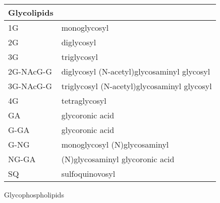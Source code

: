 \singlespace


\begin{tabular}{ l l }
Glycolipids & \\
\toprule
1G & monoglycosyl\\
2G & diglycosyl\\
3G & triglycosyl\\
2G-NAcG-G & diglycosyl (N-acetyl)glycosaminyl glycosyl\\
3G-NAcG-G & triglycosyl (N-acetyl)glycosaminyl glycosyl\\
4G & tetraglycosyl\\
GA & glycoronic acid\\
G-GA & glycoronic acid\\
G-NG & monoglycosyl (N)glycosaminyl\\
NG-GA & (N)glycosaminyl glycoronic acid\\
SQ & sulfoquinovosyl\\
\end{tabular}

Glycophospholipids


